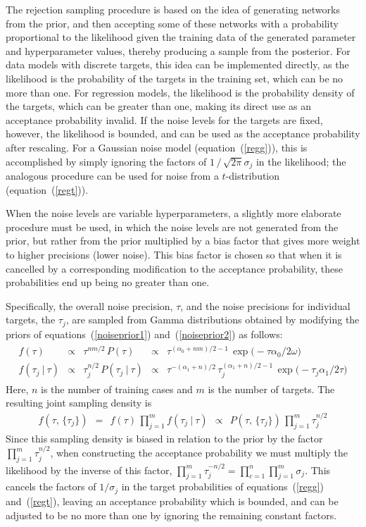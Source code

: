 \documentclass{report}[11pt]
\def\beq{\begin{eqnarray}}
\def\eeq{\end{eqnarray}}
\begin{document}
The rejection sampling procedure is based on the idea of generating
networks from the prior, and then accepting some of these networks
with a probability proportional to the likelihood given the training
data of the generated parameter and hyperparameter values, thereby
producing a sample from the posterior.  For data models with discrete
targets, this idea can be implemented directly, as the likelihood is
the probability of the targets in the training set, which can be no
more than one.  For regression models, the likelihood is the
probability density of the targets, which can be greater than one,
making its direct use as an acceptance probability invalid.  If the
noise levels for the targets are fixed, however, the likelihood is
bounded, and can be used as the acceptance probability after
rescaling.  For a Gaussian noise model (equation~(\ref{regg})), this
is accomplished by simply ignoring the factors of
$1\,/\,\sqrt{2\pi}\sigma_j$ in the likelihood; the analogous procedure
can be used for noise from a $t$-distribution (equation~(\ref{regt})).

When the noise levels are variable hyperparameters, a slightly more
elaborate procedure must be used, in which the noise levels are not
generated from the prior, but rather from the prior multiplied by a
bias factor that gives more weight to higher precisions (lower noise).
This bias factor is chosen so that when it is cancelled by a
corresponding modification to the acceptance probability, these
probabilities end up being no greater than one.

Specifically, the overall noise precision, $\tau$, and the noise
precisions for individual targets, the $\tau_j$, are sampled from
Gamma distributions obtained by modifying the priors of 
equations~(\ref{noiseprior1}) and~(\ref{noiseprior2}) as follows:\beq
\begin{array}{rcccl}
  f(\tau) &\propto&\tau^{nm/2}\, P(\tau) &\propto&
    \tau^{(\alpha_0+nm)/2-1}\, \exp \big(-\tau \alpha_{0} \big/ 2 \omega \big) 
  \\[3pt]
  f(\tau_j\ |\ \tau) &\propto& \tau_j^{n/2}\, P(\tau_j\ |\ \tau) &\propto&
    \tau^{-(\alpha_1+n)/2}\,
    \tau_j^{(\alpha_1+n)/2-1}\,
    \exp \big(-\tau_{j} \alpha_{1} \big/ 2 \tau \big)
\end{array}
\eeq%
Here, $n$ is the number of training cases and $m$ is the number of
targets.  The resulting joint sampling density is\vspace{-4pt}\beq
  f(\tau,\,\{\tau_j\}) \ \ =\ \ f(\tau)\,\prod_{j=1}^m f(\tau_j\ |\ \tau)
   \ \ \propto\ \ P(\tau,\,\{\tau_j\})\,\prod_{j=1}^m \tau_j^{n/2}
\eeq%
Since this sampling density is biased in relation to the prior by the
factor $\prod\limits_{j=1}^m \tau_j^{n/2}$, when constructing the
acceptance probability we must multiply the likelihood by the
inverse of this factor, $\prod\limits_{j=1}^m \tau_j^{-n/2} =
\prod\limits_{c=1}^n \prod\limits_{j=1}^m \sigma_j$.  This cancels the
factors of $1/\sigma_j$ in the target probabilities of
equations~(\ref{regg}) and~(\ref{regt}), leaving an acceptance probability
which is bounded, and can be adjusted to be no more than one by ignoring
the remaining constant factors.
\end{document}
